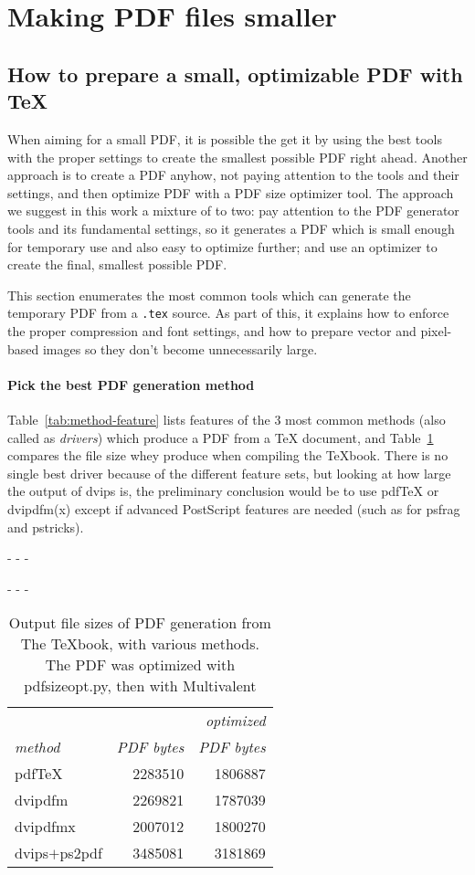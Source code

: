 \documentclass{ltugproc}
\def\cmd{\textsf}
\def\pkg{\textsf}
\def\captiontop#1{%
  \advance\abovecaptionskip-\belowcaptionskip
  \advance\belowcaptionskip\abovecaptionskip
  \advance\abovecaptionskip-\belowcaptionskip
  \abovecaptionskip-\abovecaptionskip
  \caption{#1}%
  \advance\abovecaptionskip-\belowcaptionskip
  \advance\belowcaptionskip\abovecaptionskip
  \advance\abovecaptionskip-\belowcaptionskip
  \abovecaptionskip-\abovecaptionskip
}
\begin{document}
\section{Making PDF files smaller}

\subsection{How to prepare a small, optimizable PDF with \TeX{}}\label{tex-to-pdf}

When aiming for a small PDF, it is possible the get it by using the best
tools with the proper settings to create the smallest possible PDF right
ahead. Another approach is to create a PDF anyhow, not paying attention to
the tools and their settings, and then optimize PDF with a PDF size
optimizer tool. The approach we suggest in this work a mixture of to two:
pay attention to the PDF generator tools and its fundamental settings, so it
generates a PDF which is small enough for temporary use and also
easy to optimize further; and use an optimizer to create the final, smallest
possible PDF.

This section enumerates the most common tools which can generate the
temporary PDF from a \texttt{.tex} source. As part of this, it explains how
to enforce the proper compression and font settings, and how to
prepare vector and pixel-based images so they don't become unnecessarily
large.

\paragraph{Pick the best PDF generation method}
Table~\ref{tab:method-feature} lists features of the 3 most common methods
(also called as \emph{drivers}) which produce a PDF from a \TeX{} document,
and Table~\ref{tab:texbook-to-pdf} compares the file size whey produce when
compiling the \TeX{}book. There is no single best driver because of the
different feature sets, but looking at how large the output of \cmd{dvips}
is, the preliminary conclusion would be to use pdf\TeX{}
or \cmd{dvipdfm(x)} except if advanced PostScript features are needed (such
as for \pkg{psfrag} and \pkg{pstricks}).

\begin{table}
\captiontop{Output file sizes of PDF generation from The \TeX{}book, with
various methods. The PDF was optimized with \cmd{pdfsizeopt.py}, then with
Multivalent}\label{tab:texbook-to-pdf}
\par\small\noindent\hfil
\begin{tabular}{@{}lrr@{}}
\toprule
                  &&\emph{optimized}\\
\emph{method}     &\emph{PDF bytes}&\emph{PDF bytes}\\\midrule
pdf\TeX           &2283510 &1806887\\
\cmd{dvipdfm}     &2269821 &1787039\\
\cmd{dvipdfmx}    &2007012 &1800270\\
\cmd{dvips}$+$\cmd{ps2pdf}      &3485081 &3181869\\
\bottomrule
\end{tabular}
\end{table}
\end{document}
